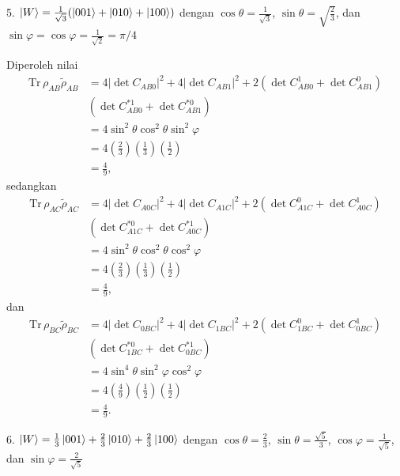5. {$\ket{W}=\frac{1}{\sqrt{3}}(\ket{001}+\ket{010}+\ket{100})$}
dengan $\cos\theta=\frac{1}{\sqrt{3}}$, $\sin\theta=\sqrt{\frac{2}{3}}$, dan $\sin\varphi=\cos\varphi=\frac{1}{\sqrt{2}}=\pi/4$

Diperoleh nilai
\begin{equation}
	\begin{aligned}
		\mathrm{Tr}\,\rho_{AB}\tilde{\rho}_{AB}
		&=4 |\det C_{AB0}|^2+ 4 |\det C_{AB1}|^2+ 2 (\det C_{AB0}^1 + \det C_{AB1}^0)\\
		&(\det C^{*1}_{AB0} + \det C^{*0}_{AB1})\\
		&=4\sin^2\theta \cos^2\theta \sin^2\varphi\\
		&=4(\frac{2}{3})(\frac{1}{3})(\frac{1}{2})\\
		&=\frac{4}{9},
	\end{aligned}
\end{equation}
sedangkan
\begin{equation}
	\begin{aligned}
		\mathrm{Tr}\,\rho_{AC}\tilde{\rho}_{AC}
		&=4|\det C_{A0C}|^2+4|\det C_{A1C}|^2+2(\det C_{A1C}^0+ \det C_{A0C}^1)\\
		&(\det C^{*0}_{A1C} + \det C^{*1}_{A0C})\\
		&=4\sin^2\theta \cos^2\theta \cos^2\varphi\\
		&=4(\frac{2}{3})(\frac{1}{3})(\frac{1}{2})\\
		&=\frac{4}{9},
	\end{aligned}
\end{equation}
dan
\begin{equation}
	\begin{aligned}
		\mathrm{Tr}\,\rho_{BC}\tilde{\rho}_{BC}
		&=4|\det C_{0BC}|^2+4|\det C_{1BC}|^2+2(\det C_{1BC}^0+ \det C_{0BC}^1)\\
		&(\det C^{*0}_{1BC} + \det C^{*1}_{0BC})\\
		&=4\sin^4\theta \sin^2\varphi\cos^2\varphi\\
		&=4(\frac{4}{9})(\frac{1}{2})(\frac{1}{2})\\
		&=\frac{4}{9}.
	\end{aligned}
\end{equation}

6. {$\ket{W}=\frac{1}{3}\ket{001}+\frac{2}{3}\ket{010}+\frac{2}{3}\ket{100}$}
dengan $\cos\theta=\frac{2}{3}$, $\sin\theta={\frac{\sqrt{5}}{3}}$, $\cos\varphi=\frac{1}{\sqrt{5}}$, dan $\sin\varphi=\frac{2}{\sqrt{5}}$

